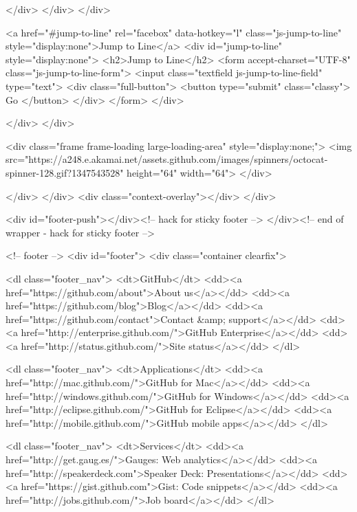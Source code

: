           </div>
        </div>
      </div>

      <a href="#jump-to-line" rel="facebox" data-hotkey="l" class="js-jump-to-line" style="display:none">Jump to Line</a>
      <div id="jump-to-line" style="display:none">
        <h2>Jump to Line</h2>
        <form accept-charset="UTF-8" class="js-jump-to-line-form">
          <input class="textfield js-jump-to-line-field" type="text">
          <div class="full-button">
            <button type="submit" class="classy">
              Go
            </button>
          </div>
        </form>
      </div>

    </div>
</div>

<div class="frame frame-loading large-loading-area" style="display:none;">
  <img src="https://a248.e.akamai.net/assets.github.com/images/spinners/octocat-spinner-128.gif?1347543528" height="64" width="64">
</div>

        </div>
      </div>
      <div class="context-overlay"></div>
    </div>

      <div id="footer-push"></div><!-- hack for sticky footer -->
    </div><!-- end of wrapper - hack for sticky footer -->

      <!-- footer -->
      <div id="footer">
  <div class="container clearfix">

      <dl class="footer_nav">
        <dt>GitHub</dt>
        <dd><a href="https://github.com/about">About us</a></dd>
        <dd><a href="https://github.com/blog">Blog</a></dd>
        <dd><a href="https://github.com/contact">Contact &amp; support</a></dd>
        <dd><a href="http://enterprise.github.com/">GitHub Enterprise</a></dd>
        <dd><a href="http://status.github.com/">Site status</a></dd>
      </dl>

      <dl class="footer_nav">
        <dt>Applications</dt>
        <dd><a href="http://mac.github.com/">GitHub for Mac</a></dd>
        <dd><a href="http://windows.github.com/">GitHub for Windows</a></dd>
        <dd><a href="http://eclipse.github.com/">GitHub for Eclipse</a></dd>
        <dd><a href="http://mobile.github.com/">GitHub mobile apps</a></dd>
      </dl>

      <dl class="footer_nav">
        <dt>Services</dt>
        <dd><a href="http://get.gaug.es/">Gauges: Web analytics</a></dd>
        <dd><a href="http://speakerdeck.com">Speaker Deck: Presentations</a></dd>
        <dd><a href="https://gist.github.com">Gist: Code snippets</a></dd>
        <dd><a href="http://jobs.github.com/">Job board</a></dd>
      </dl>

